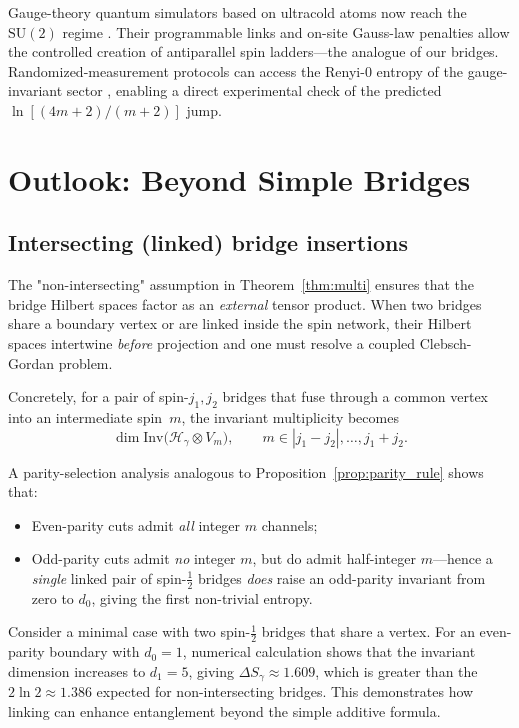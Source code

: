 \documentclass[11pt, a4paper]{article}
\theoremstyle{plain}
\theoremstyle{definition}
\theoremstyle{remark}
\newcommand{\Hil}{\mathcal{H}}
\newcommand{\Inv}{\mathrm{Inv}}
\newcommand{\SU}{\mathrm{SU}}
\begin{document}
Gauge-theory quantum simulators based on ultracold atoms now reach the $\SU(2)$ regime \cite{Zohar2023GaugeSim}. Their programmable links and on-site Gauss-law penalties allow the controlled creation of antiparallel spin ladders—the analogue of our bridges. Randomized-measurement protocols can access the Renyi-0 entropy of the gauge-invariant sector \cite{Dreyer2022GaugeRenyi}, enabling a direct experimental check of the predicted $\ln[(4m+2)/(m+2)]$ jump.

\section{Outlook: Beyond Simple Bridges}
\label{sec:outlook}

\subsection{Intersecting (linked) bridge insertions}
\label{sec:intersecting}

The "non-intersecting" assumption in Theorem~\ref{thm:multi} ensures that the bridge Hilbert spaces factor as an \emph{external} tensor product. When two bridges share a boundary vertex or are linked inside the spin network, their Hilbert spaces intertwine \emph{before} projection and one must resolve a coupled Clebsch-Gordan problem.

Concretely, for a pair of spin-$j_{1},j_{2}$ bridges that fuse through a common vertex into an intermediate spin~$m$, the invariant multiplicity becomes
\[  \dim \Inv\!\bigl(\Hil_{\gamma}\otimes V_{m}\bigr),  \qquad  m\in |j_{1}-j_{2}|,\dots,j_{1}+j_{2}.\]

A parity-selection analysis analogous to Proposition~\ref{prop:parity_rule} shows that:
\begin{itemize}\setlength\itemsep{4pt}
\item Even-parity cuts admit \emph{all} integer $m$ channels;
\item Odd-parity cuts admit \emph{no} integer $m$, but do admit half-integer $m$—hence a \emph{single} linked pair of spin-$\frac{1}{2}$ bridges \emph{does} raise an odd-parity invariant from zero to $d_{0}$, giving the first non-trivial entropy.
\end{itemize}

\begin{example}
Consider a minimal case with two spin-$\frac{1}{2}$ bridges that share a vertex. For an even-parity boundary with $d_0=1$, numerical calculation shows that the invariant dimension increases to $d_1=5$, giving $\Delta S_{\gamma} \approx 1.609$, which is greater than the $2\ln 2 \approx 1.386$ expected for non-intersecting bridges. This demonstrates how linking can enhance entanglement beyond the simple additive formula.
\end{example}
\end{document}
